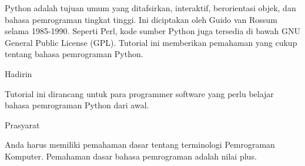 
\sloppy
Python adalah tujuan umum yang ditafsirkan, interaktif, berorientasi objek, dan bahasa pemrograman tingkat tinggi. Ini diciptakan oleh Guido van Rossum selama 1985-1990. Seperti Perl, kode sumber Python juga tersedia di bawah GNU General Public License (GPL). Tutorial ini memberikan pemahaman yang cukup tentang bahasa pemrograman Python. \par
\vspace{12pt}
\noindent 
Hadirin \par
\noindent 
Tutorial ini dirancang untuk para programmer software yang perlu belajar bahasa pemrograman Python dari awal. \par
\vspace{12pt}
\noindent 
Prasyarat \par
\noindent 
Anda harus memiliki pemahaman dasar tentang terminologi Pemrograman Komputer. Pemahaman dasar bahasa pemrograman adalah nilai plus. \par
\vspace{12pt}

